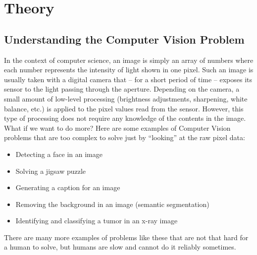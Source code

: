 \documentclass[a4paper]{article}
\begin{document}
\section{Theory}

	\subsection{Understanding the Computer Vision Problem}
		In the context of computer science, an image is simply an array of numbers where each number represents the intensity of light shown in one pixel.
		Such an image is usually taken with a digital camera that -- for a short period of time -- exposes its sensor to the light passing through the aperture.
		Depending on the camera, a small amount of low-level processing (brightness adjustments, sharpening, white balance, etc.\@) is applied to the pixel values read from the sensor.
		However, this type of processing does not require any knowledge of the contents in the image.
		What if we want to do more? 
		Here are some examples of Computer Vision problems that are too complex to solve just by ``looking'' at the raw pixel data:
		\begin{itemize}
			\item Detecting a face in an image 
			\item Solving a jigsaw puzzle
			\item Generating a caption for an image
			\item Removing the background in an image (semantic segmentation)
			\item Identifying and classifying a tumor in an x-ray image
		\end{itemize}
		There are many more examples of problems like these that are not that hard for a human to solve, but humans are slow and cannot do it reliably sometimes.
		
\end{document}

